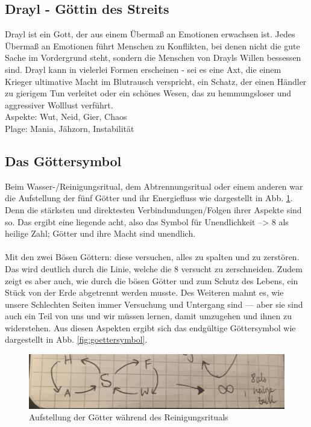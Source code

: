 \subsection{\textbf{Drayl} - Göttin des Streits}
Drayl ist ein Gott, der aus einem Übermaß an Emotionen erwachsen ist. Jedes Übermaß an Emotionen führt Menschen zu Konflikten, bei denen nicht die gute Sache im Vordergrund 
steht, sondern die Menschen von Drayls Willen bessessen sind. Drayl kann in vielerlei Formen erscheinen - sei es eine Axt, die einem Krieger ultimative Macht im Blutrausch 
verspricht, ein Schatz, der einen Händler zu gierigem Tun verleitet oder ein schönes Wesen, das zu hemmungsloser und aggressiver Wolllust verführt.\\
Aspekte: Wut, Neid, Gier, Chaos\\
Plage: Mania, Jähzorn, Instabilität

\subsection{Das Göttersymbol} \label{sec:goettersymbol}
Beim Wasser-/Reinigungsritual, dem Abtrennungsritual oder einem anderen war die Aufstellung der fünf Götter und ihr Energiefluss wie dargestellt in Abb. \ref{fig:goetteraufstellung}. Denn die stärksten und direktesten Verbindundungen/Folgen ihrer Aspekte sind so. Das ergibt eine liegende acht, also das Symbol für Unendlichkeit --> 8 als heilige Zahl; Götter und ihre Macht sind unendlich.\\
\\
Mit den zwei Bösen Göttern: diese versuchen, alles zu spalten und zu zerstören. Das wird deutlich durch die Linie, welche die 8 versucht zu zerschneiden. Zudem zeigt es aber auch, wie durch die bösen Götter und zum Schutz des Lebens, ein Stück von der Erde abgetrennt werden musste. Des Weiteren mahnt es, wie unsere Schlechten Seiten immer Versuchung und Untergang sind — aber sie sind auch ein Teil von uns und wir müssen lernen, damit umzugehen und ihnen zu widerstehen. Aus diesen Aspekten ergibt sich das endgültige Göttersymbol wie dargestellt in Abb. \ref{fig:goettersymbol}.\\

\begin{figure}
	\centering
	\includegraphics[width=0.7\linewidth]{Abbildungen/Gesellschaft/GoetteraufstellungbeiReinigungsritual}
	\caption{Aufstellung der Götter während des Reinigungsrituals}
	\label{fig:goetteraufstellung}
\end{figure}


